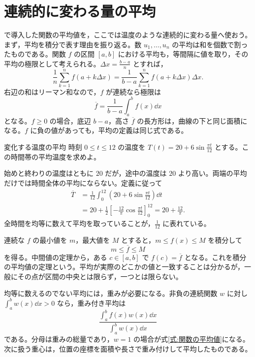 \section{連続的に変わる量の平均}\label{節:関数の平均}

で導入した関数の平均値を，ここでは温度のような連続的に変わる量へ使おう。まず，平均を積分で表す理由を振り返る。数 $u_1,\ldots,u_n$ の平均は和を個数で割ったものである。関数 $f$ の区間 $[a,b]$ における平均も，等間隔に値を取り，その平均の極限として考えられる。$\Delta x=\frac{b-a}{n}$ とすれば，
\[
\frac1n\sum_{k=1}^n f(a+k\Delta x)
 =\frac{1}{b-a}\sum_{k=1}^n f(a+k\Delta x)\Delta x.
\]
右辺の和はリーマン和なので，$f$ が連続なら極限は
\begin{equation}\label{式:関数の平均値}
\overline f=\frac{1}{b-a}\int_a^b f(x)\dd x
\end{equation}
となる。$f\geq0$ の場合，底辺 $b-a$，高さ $\overline f$ の長方形は，曲線の下と同じ面積になる。$f$ に負の値があっても，平均の定義は同じ式である。

\begin{example}{変化する温度の平均}
時刻 $0\leq t\leq12$ の温度を $T(t)=20+6\sin\frac{\pi t}{12}$ とする。この時間帯の平均温度を求めよ。
\end{example}

始めと終わりの温度はともに $20$ だが，途中の温度は $20$ より高い。両端の平均だけでは時間全体の平均にならない。定義に従って
\[
\begin{aligned}
\overline T
 &=\frac1{12}\int_0^{12}\left(20+6\sin\frac{\pi t}{12}\right)\dd t\\
 &=20+\frac12\left[-\frac{12}{\pi}\cos\frac{\pi t}{12}\right]_0^{12}
 =20+\frac{12}{\pi}.
\end{aligned}
\]
全時間を均等に数えて平均を取っていることが，$\frac1{12}$ に表れている。

連続な $f$ の最小値を $m$，最大値を $M$ とすると，$m\leq f(x)\leq M$ を積分して
\[
m\leq\overline f\leq M
\]
を得る。中間値の定理から，ある $c\in[a,b]$ で $f(c)=\overline f$ となる。これを積分の平均値の定理という。平均が実際のどこかの値と一致することは分かるが，一般にその点が区間の中央とは限らず，一つとは限らない。

均等に数えるのでない平均には，重みが必要になる。非負の連続関数 $w$ に対し $\int_a^b w(x)\dd x>0$ なら，重み付き平均は
\[
\frac{\int_a^b f(x)w(x)\dd x}{\int_a^b w(x)\dd x}
\]
である。分母は重みの総量であり，$w=1$ の場合が式\eqref{式:関数の平均値}になる。次に扱う重心は，位置の座標を面積や長さで重み付けして平均したものである。

